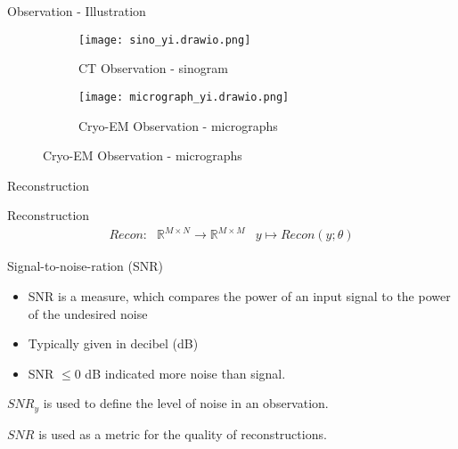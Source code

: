 \begin{frame}{Observation - Illustration }

    \begin{figure}
    \centering
    \begin{subfigure}{0.25\textwidth}
        \texttt{[image: sino\_yi.drawio.png]}
        \caption{CT Observation - sinogram}
    \end{subfigure}
    \begin{subfigure}{0.6\textwidth}
        \texttt{[image: micrograph\_yi.drawio.png]}
        \caption{Cryo-EM Observation - micrographs}
    \end{subfigure}
\end{figure}

\end{frame}


\begin{frame}{Reconstruction}
    \pause
  
    \begin{block}{Reconstruction}
        \begin{equation}
            \begin{aligned}
                \textit{Recon} : & \mathbb{R}^{M \times N} \to \mathbb{R}^{M \times M} & y \mapsto Recon(y; \theta)
            \end{aligned}
        \end{equation}
    \end{block}
\end{frame}



\begin{frame}{Signal-to-noise-ration (SNR)}
    \pause
    \begin{itemize}
        \item SNR is a measure, which compares the power of an input signal to the power of the undesired noise
        \item Typically given in decibel (dB)
        \item SNR $\le 0$ dB indicated more noise than signal. 
    \end{itemize}


    \begin{tcolorbox}[colback=red!5!white,hide=<1-2>, alert=<3>, colframe=red!75!black]
        $SNR_y$ is used to define the level of noise in an observation.
    \end{tcolorbox}

        
    \begin{tcolorbox}[colback=red!5!white,hide=<1-3>, alert=<4>, colframe=red!75!black]
        $SNR$ is used as a metric for the quality of reconstructions.
    \end{tcolorbox}

\end{frame}



